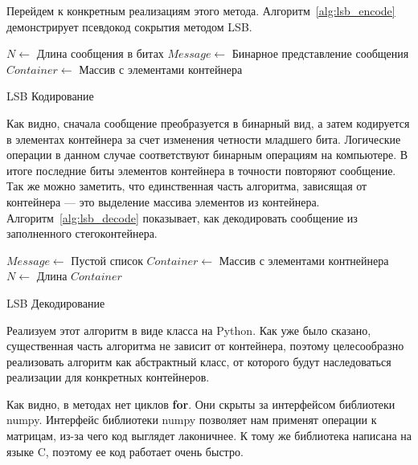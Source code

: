 Перейдем к конкретным реализациям этого метода. Алгоритм~\ref{alg:lsb_encode}
демонстрирует псевдокод сокрытия методом LSB.
\begin{algorithm}[ht!]
     $N \leftarrow$ Длина сообщения в битах\;
     $Message \leftarrow$ Бинарное представление сообщения\;
     $Container \leftarrow$ Массив с элементами контейнера\;
     \caption{LSB Кодирование}
    \label{alg:lsb_encode}
\end{algorithm}
Как видно, сначала сообщение преобразуется в бинарный вид,
а затем кодируется в элементах контейнера за счет изменения четности младшего бита.
Логические операции в данном случае соответствуют бинарным операциям на компьютере.
В итоге последние биты элементов контейнера в точности повторяют сообщение.
Так же можно заметить, что единственная часть алгоритма, зависящая от контейнера
--- это выделение массива элементов из контейнера. Алгоритм~\ref{alg:lsb_decode}
показывает, как декодировать сообщение из заполненного стегоконтейнера.
\begin{algorithm}[ht!]
    $Message \leftarrow$ Пустой список\;
    $Container \leftarrow$ Массив с элементами контнейнера\;
    $N \leftarrow$ Длина $Container$\;
    \caption{LSB Декодирование}
    \label{alg:lsb_decode}
\end{algorithm}

Реализуем этот алгоритм в виде класса на Python. Как уже было сказано,
существенная часть алгоритма не зависит от контейнера,
поэтому целесообразно реализовать алгоритм как абстрактный класс,
от которого будут наследоваться реализации для конкретных контейнеров.


Как видно, в методах нет циклов \textbf{for}. Они скрыты за интерфейсом библиотеки numpy.
Интерфейс библиотеки numpy позволяет нам применят операции к матрицам,
из-за чего код выглядет лаконичнее. К тому же библиотека написана на языке C,
поэтому ее код работает очень быстро.

